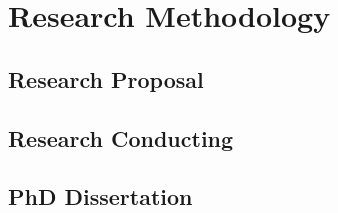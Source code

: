 \section{Research Methodology}

\subsection{Research Proposal}
\subsection{Research Conducting}
\subsection{PhD Dissertation}
  